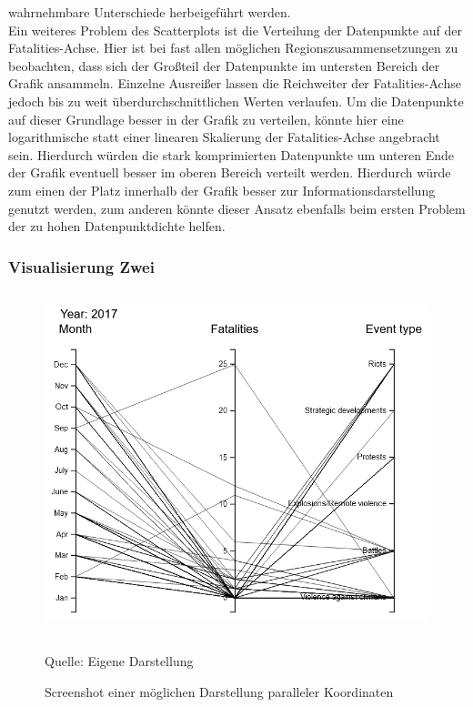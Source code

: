 \documentclass[usegeometry=true]{scrartcl}
\begin{document}
wahrnehmbare Unterschiede herbeigeführt werden.\\ Ein weiteres Problem des Scatterplots ist die Verteilung der Datenpunkte auf der Fatalities-Achse. Hier ist bei fast allen möglichen Regionszusammensetzungen zu beobachten, dass sich der Großteil der Datenpunkte im untersten Bereich der Grafik ansammeln. Einzelne Ausreißer lassen die Reichweiter der Fatalities-Achse jedoch bis zu weit überdurchschnittlichen Werten verlaufen. Um die Datenpunkte auf dieser Grundlage besser in der Grafik zu verteilen, könnte hier eine logarithmische statt einer linearen Skalierung der Fatalities-Achse angebracht sein. Hierdurch würden die stark komprimierten Datenpunkte um unteren Ende der Grafik eventuell besser im oberen Bereich verteilt werden. Hierdurch würde zum einen der Platz innerhalb der Grafik besser zur Informationsdarstellung genutzt werden, zum anderen könnte dieser Ansatz ebenfalls beim ersten Problem der zu hohen Datenpunktdichte helfen.\\

\subsubsection{Visualisierung Zwei}

\begin{figure}[]
\begin{center}
\includegraphics[width=12cm,height=10cm,keepaspectratio]{ParalleleKoordinaten.PNG}%
\caption{Screenshot einer möglichen Darstellung paralleler Koordinaten}
Quelle: Eigene Darstellung
\label{parallelCoordinates}
\end{center}
\end{figure}
\end{document}
